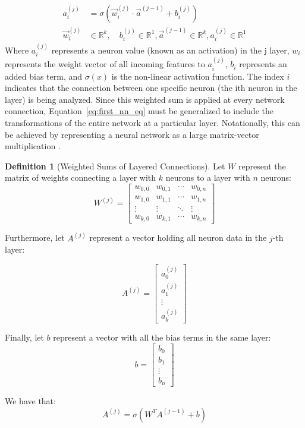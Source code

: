 \documentclass{article}
\theoremstyle{definition}
\newtheorem{definition}{Definition}[section]
\begin{document}
\begin{equation}
\label{eq:first_nn_eq}
\begin{aligned}
a_i^{(j)} &= \sigma(\Vec{w}^{(j)}_i \cdot \Vec{a}^{(j-1)} + b^{(j)}_i) \\
\Vec{w}^{(j)}_i &\in \mathbb{R}^{k},\quad b^{(j)}_i \in \mathbb{R}^1,\Vec{a}^{(j-1)} \in \mathbb{R}^{k}, a_i^{(j)} \in \mathbb{R}^1
\end{aligned}
\end{equation}
Where $a_i^{(j)}$ represents a neuron value (known as an activation) in the j layer, $w_i$ represents the weight vector of all incoming features to $a_i^{(j)}$, $b_i$ represents an added bias term, and $\sigma(x)$ is the non-linear activation function. The index $i$  indicates that the connection between one specific neuron (the ith neuron in the layer) is being analyzed. 
Since this weighted sum is applied at every network connection, Equation~\eqref{eq:first_nn_eq} must be generalized to include the transformations of the entire network at a particular layer. Notationally, this can be achieved by representing a neural network as a large matrix-vector multiplication \cite{3blue1brown_nn}. 
\begin{definition}[Weighted Sums of Layered Connections]

Let \( W \) represent the matrix of weights connecting a layer with \( k \) neurons to a layer with \( n \) neurons:
\[
W^{(j)} =
\begin{bmatrix}
w_{0,0} & w_{0,1} & \cdots & w_{0,n} \\
w_{1,0} & w_{1,1} & \cdots & w_{1,n} \\
\vdots & \vdots & \ddots & \vdots \\
w_{k,0} & w_{k,1} & \cdots & w_{k,n}
\end{bmatrix}
\]


Furthermore, let \( A^{(j)} \) represent a vector holding all neuron data in the \( j\)-th layer:

\[
A^{(j)} = 
\begin{bmatrix}
a^{(j)}_0 \\
a^{(j)}_1 \\
\vdots \\
a^{(j)}_k
\end{bmatrix}
\]

Finally, let \( b \) represent a vector with all the bias terms in the same layer:
\[
b = 
\begin{bmatrix}
b_0 \\
b_1 \\
\vdots \\
b_n
\end{bmatrix}
\]

We have that:
\begin{equation}
\label{eq:nn_eq}
A^{(j)} = \sigma(W^T A^{(j-1)} + b)
\end{equation}

\end{definition}
\end{document}
